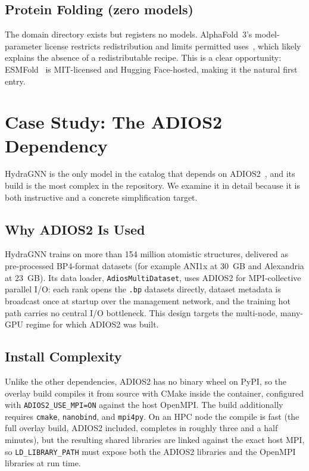 \documentclass[11pt]{article}
\newcommand{\code}[1]{\texttt{#1}}
\begin{document}
\subsection{Protein Folding (zero models)}
The domain directory exists but registers no models. AlphaFold~3's model-parameter
license restricts redistribution and limits permitted uses~\cite{abramson2024alphafold3},
which likely explains the absence of a redistributable recipe. This is a clear
opportunity: ESMFold~\cite{lin2023esmfold} is MIT-licensed and Hugging Face-hosted,
making it the natural first entry.

\section{Case Study: The ADIOS2 Dependency}
\label{sec:adios}

HydraGNN is the only model in the catalog that depends on
ADIOS2~\cite{godoy2020adios2}, and its build is the most complex in the repository.
We examine it in detail because it is both instructive and a concrete simplification
target.

\subsection{Why ADIOS2 Is Used}
HydraGNN trains on more than 154 million atomistic structures, delivered as
pre-processed BP4-format datasets (for example ANI1x at 30~GB and Alexandria at
23~GB). Its data loader, \code{AdiosMultiDataset}, uses ADIOS2 for MPI-collective
parallel I/O: each rank opens the \code{.bp} datasets directly, dataset metadata is
broadcast once at startup over the management network, and the training hot path
carries no central I/O bottleneck. This design targets the multi-node,
many-GPU regime for which ADIOS2 was built.

\subsection{Install Complexity}
Unlike the other dependencies, ADIOS2 has no binary wheel on PyPI, so the overlay
build compiles it from source with CMake inside the container, configured with
\code{ADIOS2\_USE\_MPI=ON} against the host OpenMPI. The build additionally requires
\code{cmake}, \code{nanobind}, and \code{mpi4py}. On an HPC node the compile is fast
(the full overlay build, ADIOS2 included, completes in roughly three and a half
minutes), but the resulting shared libraries are linked against the exact host MPI,
so \code{LD\_LIBRARY\_PATH} must expose both the ADIOS2 libraries and the OpenMPI
libraries at run time.
\end{document}
